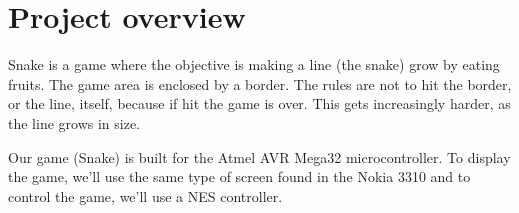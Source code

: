 \chapter{Project overview}

Snake is a game where the objective is making a line (the snake) grow by eating fruits. The game area is enclosed by a border. The rules are not to hit the border, or the line, itself, because if hit the game is over. This gets increasingly harder, as the line grows in size.

Our game (Snake) is built for the Atmel AVR Mega32 microcontroller. To display the game, we'll use the same type of screen found in the Nokia 3310 and to control the game, we'll use a NES controller.

